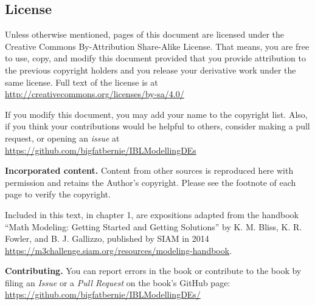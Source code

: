 \subsection*{License}
Unless otherwise mentioned, pages of this document are licensed under
the Creative Commons By-Attribution Share-Alike License. That means, you are free
to use, copy, and modify this document provided that you provide attribution to the
previous copyright holders and you release your derivative work under the same license.
Full text of the license is at \url{http://creativecommons.org/licenses/by-sa/4.0/}

If you modify this document, you may add your name to the copyright list. Also,
if you think your contributions would be helpful to others, consider making a
pull request, or opening an \emph{issue} at \url{https://github.com/bigfatbernie/IBLModellingDEs}

{\bf Incorporated content.}
Content from other sources is reproduced here with permission and retains the Author's copyright. Please see the footnote of each page to verify the copyright.

Included in this text, in chapter 1, are expositions adapted from the handbook ``Math Modeling: Getting Started and Getting Solutions'' by K. M. Bliss, K. R. Fowler, and B. J. Gallizzo, published by SIAM in 2014 \url{https://m3challenge.siam.org/resources/modeling-handbook}.


{\bf Contributing.} You can report errors in the book or contribute to the book by filing an \emph{Issue} or a \emph{Pull Request} on the book's GitHub page: \url{https://github.com/bigfatbernie/IBLModellingDEs/}







